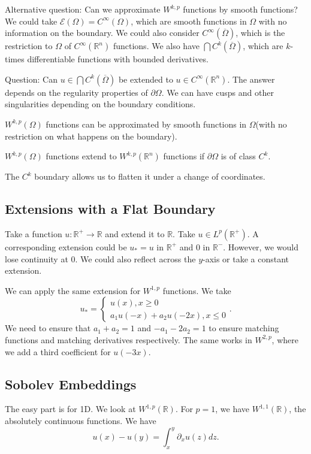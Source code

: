 \documentclass[12pt]{scrartcl}
\newcommand{\R}{\mathbb{R}}
\let \mc \mathcal
\begin{document}
Alternative question: Can we approximate $W^{k, p}$ functions by smooth functions?  We could take $\mc E(\Omega) = C^{\infty}(\Omega)$, which are smooth functions in $\Omega$ with no information on the boundary.  We could also consider $C^{\infty}(\overline{\Omega})$, which is the restriction to $\Omega$ of $C^\infty(\R^n)$ functions.  We also have $\bigcap C^k(\overline{\Omega})$, which are $k$-times differentiable functions with bounded derivatives.  

Question:  Can $u \in \bigcap C^k(\overline{\Omega})$ be extended to $u \in C^{\infty}(\R^n)$.  The answer depends on the regularity properties of $\partial \Omega$.  We can have cusps and other singularities depending on the boundary conditions.

\begin{proposition} $W^{k, p}(\Omega)$ functions can be approximated by smooth functions in $\Omega$(with no restriction on what happens on the boundary).
\end{proposition}
\begin{proposition} $W^{k, p}(\Omega)$ functions extend to $W^{k, p}(\R^n)$ functions if $\partial \Omega$ is of class $C^k$.
\end{proposition}
The $C^k$ boundary allows us to flatten it under a change of coordinates.

\subsection{Extensions with a Flat Boundary}
Take a function $u: \R^+ \to \R$ and extend it to $\R$.  Take $u \in L^p(\R^+)$.  A corresponding extension could be $u_* = u$ in $\R^+$ and $0$ in $\R^-$.  However, we would lose continuity at $0$.  We could also reflect across the $y$-axis or take a constant extension.  

We can apply the same extension for $W^{1, p}$ functions. We take 
$$u_* = \begin{cases}
u(x), x \ge 0 \\
a_1 u(-x) + a_2 u(-2x), x \le 0
\end{cases}.
$$
We need to ensure that $a_1 + a_2 = 1$ and $-a_1 - 2a_2 = 1$ to ensure matching functions and matching derivatives respectively.  The same works in $W^{2, p}$, where we add a third coefficient for $u(-3x)$.

\subsection{Sobolev Embeddings}
The easy part is for 1D.  We look at $W^{1, p}(\R)$.   For $p= 1$, we have $W^{1, 1}(\R)$, the absolutely continuous functions.  We have 
$$u(x) - u(y) = \int_{x}^y \partial_x u(z)dz.$$
\end{document}
